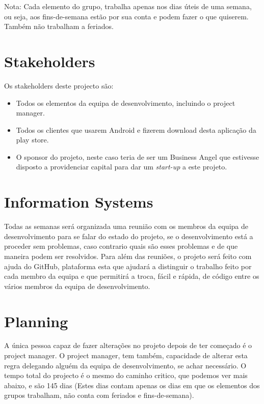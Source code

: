 \documentclass[a4paper]{article}
\begin{document}
\noindent Nota: Cada elemento do grupo, trabalha apenas nos dias úteis de uma semana, ou seja, aos fins-de-semana estão por sua conta e podem fazer o que quiserem. Também não trabalham a feriados.

\newpage

\section{Stakeholders}

Os stakeholders deste projecto são:
\begin{itemize}
\item Todos os elementos da equipa de desenvolvimento, incluindo o project manager.
\item Todos os clientes que usarem Android e fizerem download desta aplicação da play store.
\item O sponsor do projeto, neste caso teria de ser um Business Angel que estivesse disposto a providenciar capital para dar um \textit{start-up} a este projeto.
\end{itemize}

\section{Information Systems}

Todas as semanas será organizada uma reunião com os membros da equipa de desenvolvimento para se falar do estado do projeto, se o desenvolvimento está a proceder sem problemas, caso contrario quais são esses problemas e de que maneira podem ser resolvidos. Para além das reuniões, o projeto será feito com ajuda do GitHub, plataforma esta que ajudará a distinguir o trabalho feito por cada membro da equipa e que permitirá a troca, fácil e rápida, de código entre os vários membros da equipa de desenvolvimento.

\section{Planning}
A única pessoa capaz de fazer alterações no projeto depois de ter começado é o project manager. O project manager, tem também, capacidade de alterar esta regra delegando alguém da equipa de desenvolvimento, se achar necessário. O tempo total do projecto é o mesmo do caminho critico, que podemos ver mais abaixo, e são 145 dias (Estes dias contam apenas os dias em que os elementos dos grupos trabalham, não conta com feriados e fins-de-semana).
\end{document}
